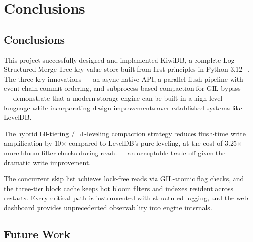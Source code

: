 \documentclass[oneside,a4paper,12pt]{book}
\begin{document}
\chapter{Conclusions}

\section{Conclusions}

This project successfully designed and implemented KiwiDB, a complete Log-Structured Merge Tree key-value store built from first principles in Python 3.12+. The three key innovations --- an async-native API, a parallel flush pipeline with event-chain commit ordering, and subprocess-based compaction for GIL bypass --- demonstrate that a modern storage engine can be built in a high-level language while incorporating design improvements over established systems like LevelDB.

The hybrid L0-tiering / L1-leveling compaction strategy reduces flush-time write amplification by 10$\times$ compared to LevelDB's pure leveling, at the cost of 3.25$\times$ more bloom filter checks during reads --- an acceptable trade-off given the dramatic write improvement.

The concurrent skip list achieves lock-free reads via GIL-atomic flag checks, and the three-tier block cache keeps hot bloom filters and indexes resident across restarts. Every critical path is instrumented with structured logging, and the web dashboard provides unprecedented observability into engine internals.

\section{Future Work}
\end{document}

